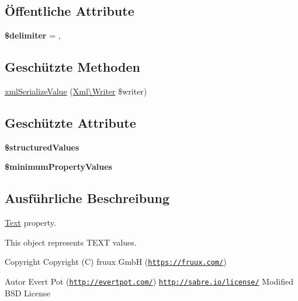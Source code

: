 \subsection*{Öffentliche Attribute}
\begin{DoxyCompactItemize}
\item 
\mbox{\label{class_sabre_1_1_v_object_1_1_property_1_1_text_a117b2c00130d0c05674d193f2891d722}} 
{\bfseries \$delimiter} = \textquotesingle{},\textquotesingle{}
\end{DoxyCompactItemize}
\subsection*{Geschützte Methoden}
\begin{DoxyCompactItemize}
\item 
\mbox{\hyperlink{class_sabre_1_1_v_object_1_1_property_1_1_text_aa92c38ce4f1e976efb8de620ef3734db}{xml\+Serialize\+Value}} (\mbox{\hyperlink{class_sabre_1_1_xml_1_1_writer}{Xml\textbackslash{}\+Writer}} \$writer)
\end{DoxyCompactItemize}
\subsection*{Geschützte Attribute}
\begin{DoxyCompactItemize}
\item 
{\bfseries \$structured\+Values}
\item 
{\bfseries \$minimum\+Property\+Values}
\end{DoxyCompactItemize}


\subsection{Ausführliche Beschreibung}
\mbox{\hyperlink{class_sabre_1_1_v_object_1_1_property_1_1_text}{Text}} property.

This object represents T\+E\+XT values.

\begin{DoxyCopyright}{Copyright}
Copyright (C) fruux GmbH (\href{https://fruux.com/}{\tt https\+://fruux.\+com/}) 
\end{DoxyCopyright}
\begin{DoxyAuthor}{Autor}
Evert Pot (\href{http://evertpot.com/}{\tt http\+://evertpot.\+com/})  \href{http://sabre.io/license/}{\tt http\+://sabre.\+io/license/} Modified B\+SD License 
\end{DoxyAuthor}


